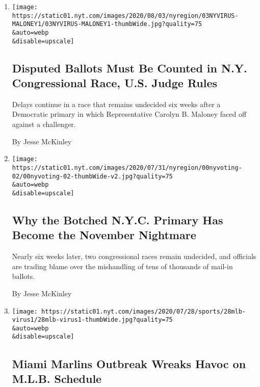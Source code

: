 \begin{enumerate}
\def\labelenumi{\arabic{enumi}.}
\item
  \href{/2020/08/03/nyregion/nyc-congress-carolyn-mahoney-ballots.html}{}

  \texttt{[image: https://static01.nyt.com/images/2020/08/03/nyregion/03NYVIRUS-MALONEY1/03NYVIRUS-MALONEY1-thumbWide.jpg?quality=75\\\&auto=webp\\\&disable=upscale]}

  \hypertarget{disputed-ballots-must-be-counted-in-ny-congressional-race-us-judge-rules}{%
  \subsection{Disputed Ballots Must Be Counted in N.Y. Congressional
  Race, U.S. Judge
  Rules}\label{disputed-ballots-must-be-counted-in-ny-congressional-race-us-judge-rules}}

  Delays continue in a race that remains undecided six weeks after a
  Democratic primary in which Representative Carolyn B. Maloney faced
  off against a challenger.

  By Jesse McKinley
\item
  \href{/2020/08/03/nyregion/nyc-mail-ballots-voting.html}{}

  \texttt{[image: https://static01.nyt.com/images/2020/07/31/nyregion/00nyvoting-02/00nyvoting-02-thumbWide-v2.jpg?quality=75\\\&auto=webp\\\&disable=upscale]}

  \hypertarget{why-the-botched-nyc-primary-has-become-the-november-nightmare}{%
  \subsection{Why the Botched N.Y.C. Primary Has Become the November
  Nightmare}\label{why-the-botched-nyc-primary-has-become-the-november-nightmare}}

  Nearly six weeks later, two congressional races remain undecided, and
  officials are trading blame over the mishandling of tens of thousands
  of mail-in ballots.

  By Jesse McKinley
\item
  \href{/2020/07/28/sports/baseball/marlins-outbreak-mlb-coronavirus.html}{}

  \texttt{[image: https://static01.nyt.com/images/2020/07/28/sports/28mlb-virus1/28mlb-virus1-thumbWide.jpg?quality=75\\\&auto=webp\\\&disable=upscale]}

  \hypertarget{miami-marlins-outbreak-wreaks-havoc-on-mlb-schedule}{%
  \subsection{Miami Marlins Outbreak Wreaks Havoc on M.L.B.
  Schedule}\label{miami-marlins-outbreak-wreaks-havoc-on-mlb-schedule}}


\end{enumerate}
